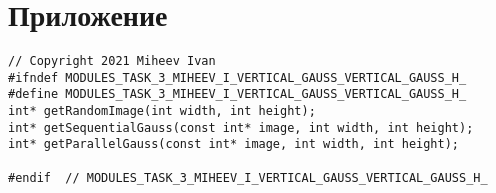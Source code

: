 \documentclass{report}
\begin{document}
\section*{Приложение}

\begin{lstlisting}
// Copyright 2021 Miheev Ivan
#ifndef MODULES_TASK_3_MIHEEV_I_VERTICAL_GAUSS_VERTICAL_GAUSS_H_
#define MODULES_TASK_3_MIHEEV_I_VERTICAL_GAUSS_VERTICAL_GAUSS_H_
int* getRandomImage(int width, int height);
int* getSequentialGauss(const int* image, int width, int height);
int* getParallelGauss(const int* image, int width, int height);

#endif  // MODULES_TASK_3_MIHEEV_I_VERTICAL_GAUSS_VERTICAL_GAUSS_H_
\end{lstlisting}
\end{document}
